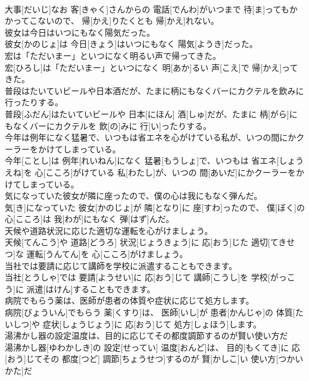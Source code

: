 \documentclass[8pt]{extreport}
\begin{document}
\begin{CJK}{UTF8}{min}
\\	大事[だいじ]なお 客[きゃく]さんからの 電話[でんわ]がいつまで 待[ま]ってもかかってこないので、 帰[かえ]りたくとも 帰[かえ]れない。
\\	彼女は今日はいつにもなく陽気だった。	
\\	彼女[かのじょ]は 今日[きょう]はいつにもなく 陽気[ようき]だった。
\\	宏は「ただいまー」といつになく明るい声で帰ってきた。	
\\	宏[ひろし]は「ただいまー」といつになく 明[あか]るい 声[こえ]で 帰[かえ]ってきた。
\\	普段はたいていビールや日本酒だが、たまに柄にもなくバーにカクテルを飲みに行ったりする。	
\\	普段[ふだん]はたいていビールや 日本[にほん] 酒[しゅ]だが、たまに 柄[がら]にもなくバーにカクテルを 飲[の]みに 行[い]ったりする。
\\	今年は例年になく猛暑で、いつもは省エネを心がけている私が、いつの間にかクーラーをかけてしまっている。	
\\	今年[ことし]は 例年[れいねん]になく 猛暑[もうしょ]で、いつもは 省エネ[しょうえね]を 心[こころ]がけている 私[わたし]が、いつの 間[あいだ]にかクーラーをかけてしまっている。
\\	気になっていた彼女が隣に座ったので、僕の心は我にもなく弾んだ。	
\\	気[き]になっていた 彼女[かのじょ]が 隣[となり]に 座[すわ]ったので、 僕[ぼく]の 心[こころ]は 我[わが]にもなく 弾[はず]んだ。
\\	天候や道路状況に応じた適切な運転を心がけましょう。	
\\	天候[てんこう]や 道路[どうろ] 状況[じょうきょう]に 応[おう]じた 適切[てきせつ]な 運転[うんてん]を 心[こころ]がけましょう。
\\	当社では要請に応じて講師を学校に派遣することもできます。	
\\	当社[とうしゃ]では 要請[ようせい]に 応[おう]じて 講師[こうし]を 学校[がっこう]に 派遣[はけん]することもできます。
\\	病院でもらう薬は、医師が患者の体質や症状に応じて処方します。	
\\	病院[びょういん]でもらう 薬[くすり]は、 医師[いし]が 患者[かんじゃ]の 体質[たいしつ]や 症状[しょうじょう]に 応[おう]じて 処方[しょほう]します。
\\	湯沸かし器の設定温度は、目的に応じてその都度調節するのが賢い使い方だ	
\\	湯沸かし器[ゆわかしき]の 設定[せってい] 温度[おんど]は、 目的[もくてき]に 応[おう]じてその 都度[つど] 調節[ちょうせつ]するのが 賢[かしこ]い 使い方[つかいかた]だ

\end{CJK}
\end{document}
